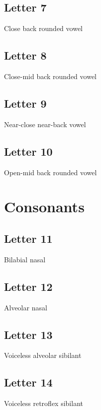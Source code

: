 \documentclass{book}
\newcommand{\letter}[1]{\begin{center}\resizebox{1cm}{!}{\texttt{[image: \#1]}}\end{center}}
\begin{document}
\letter{letters/vowels/6.JPG}


\section{Letter 7}
Close back rounded vowel

\letter{letters/vowels/7.JPG}


\section{Letter 8}
Close-mid back rounded vowel

\letter{letters/vowels/8.JPG}


\section{Letter 9}
Near-close near-back vowel

\letter{letters/vowels/9.JPG}


\section{Letter 10}
Open-mid back rounded vowel

\letter{letters/vowels/10.JPG}



\chapter{Consonants}
\section{Letter 11}
Bilabial nasal

\letter{letters/consonants/11.JPG}


\section{Letter 12}
Alveolar nasal

\letter{letters/consonants/12.JPG}


\section{Letter 13}
Voiceless alveolar sibilant

\letter{letters/consonants/13.JPG}


\section{Letter 14}
Voiceless retroflex sibilant
\end{document}
